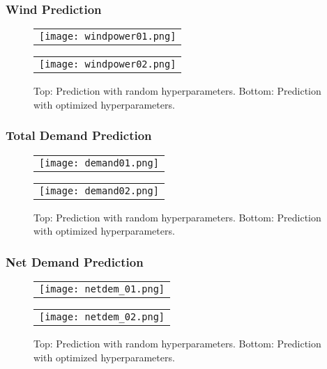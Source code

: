 \begin{frame}
  \frametitle{Wind Prediction}
  \begin{figure}
  \centering
  \begin{tabular}{@{}c@{}}
    \texttt{[image: windpower01.png]}
  \end{tabular}

  \begin{tabular}{@{}c@{}}
    \texttt{[image: windpower02.png]}
  \end{tabular}

  \caption{Top: Prediction with random hyperparameters. Bottom: Prediction with optimized hyperparameters.}\label{fig:myfig}
\end{figure}
\end{frame}
\begin{frame}
  \frametitle{Total Demand Prediction}
  \begin{figure}
  \centering
  \begin{tabular}{@{}c@{}}
    \texttt{[image: demand01.png]}
  \end{tabular}

  \begin{tabular}{@{}c@{}}
    \texttt{[image: demand02.png]}
  \end{tabular}

  \caption{Top: Prediction with random hyperparameters. Bottom: Prediction with optimized hyperparameters.}\label{fig:myfig}
\end{figure}
\end{frame}
\begin{frame}
  \frametitle{Net Demand Prediction}
  \begin{figure}
  \centering
  \begin{tabular}{@{}c@{}}
    \texttt{[image: netdem\_01.png]}
  \end{tabular}

  \begin{tabular}{@{}c@{}}
    \texttt{[image: netdem\_02.png]}
  \end{tabular}

  \caption{Top: Prediction with random hyperparameters. Bottom: Prediction with optimized hyperparameters.}\label{fig:myfig}
\end{figure}
\end{frame}

